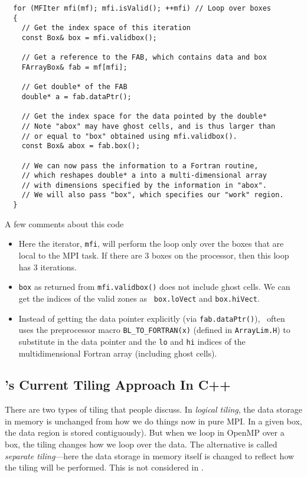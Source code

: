 \begin{lstlisting}
  for (MFIter mfi(mf); mfi.isValid(); ++mfi) // Loop over boxes
  {
    // Get the index space of this iteration
    const Box& box = mfi.validbox(); 

    // Get a reference to the FAB, which contains data and box  
    FArrayBox& fab = mf[mfi];  

    // Get double* of the FAB 
    double* a = fab.dataPtr();

    // Get the index space for the data pointed by the double* 
    // Note "abox" may have ghost cells, and is thus larger than 
    // or equal to "box" obtained using mfi.validbox().
    const Box& abox = fab.box();

    // We can now pass the information to a Fortran routine,
    // which reshapes double* a into a multi-dimensional array 
    // with dimensions specified by the information in "abox".
    // We will also pass "box", which specifies our "work" region.
  }
\end{lstlisting}
A few comments about this code
\begin{itemize}
\item Here the iterator, {\tt mfi}, will perform the loop only over the
   boxes that are local to the MPI task.  If there are 3 boxes on the
   processor, then this loop has 3 iterations.
      
\item {\tt box} as returned from {\tt mfi.validbox()} does not include
   ghost cells.  We can get the indices of the valid zones as {\tt
   box.loVect} and {\tt box.hiVect}.

\item Instead of getting the data pointer explicitly (via {\tt fab.dataPtr()}),
   \iamr\ often uses the preprocessor macro {\tt BL\_TO\_FORTRAN(x)} (defined
   in {\tt ArrayLim.H}) to substitute in the data pointer and the {\tt lo}
   and {\tt hi} indices of the multidimensional Fortran array (including ghost cells).
\end{itemize}


\subsection{\amrex's Current Tiling Approach In C++}
\label{sec:amrex1}

There are two types of tiling that people discuss.  In {\em logical
tiling}, the data storage in memory is unchanged from how we do things
now in pure MPI.  In a given box, the data region is stored
contiguously).  But when we loop in OpenMP over a box, the tiling
changes how we loop over the data.  The alternative is called {\em
separate tiling}---here the data storage in memory itself is changed
to reflect how the tiling will be performed.  This is not considered
in \amrex.


